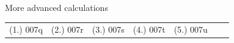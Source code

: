 \begin{exercises}{  More advanced calculations }
\begin{enumerate}[noitemsep, label=\textbf{\arabic*}. ]
\end{enumerate}
\practiceinfo
\par 
 \par \begin{tabular}[h]{cccccc}
 (1.) 007q  &  (2.) 007r  &  (3.) 007s  &  (4.) 007t  &  (5.) 007u  &    &   & \end{tabular}
\end{exercises}
